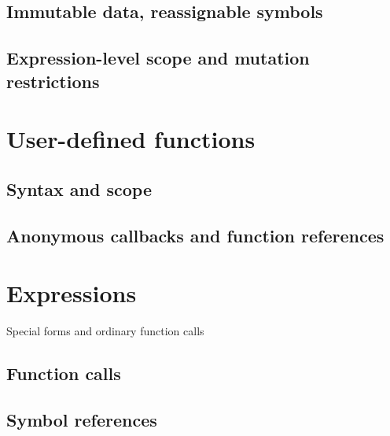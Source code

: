 \documentclass{article}
\theoremstyle{definition}
\begin{document}
\hypertarget{hsec:immutable}{}
\subsection{Immutable data, reassignable symbols}
\label{sec:immutable}

\subsection{Expression-level scope and mutation restrictions}

\pagebreak

\section{User-defined functions}

\hypertarget{hsec:fcndef}{}
\label{form:fcndef}


\hypertarget{hsec:fcnref}{}
\label{form:fcnref}


\subsection{Syntax and scope}

\subsection{Anonymous callbacks and function references}

\pagebreak

\hypertarget{hsec:expressions}{}
\section{Expressions}
\label{sec:expressions}

Special forms and ordinary function calls

\hypertarget{hsec:function-call}{}
\subsection{Function calls}
\label{sec:function-call}

\hypertarget{hsec:symbol-ref}{}
\subsection{Symbol references}
\label{sec:symbol-ref}
\end{document}
